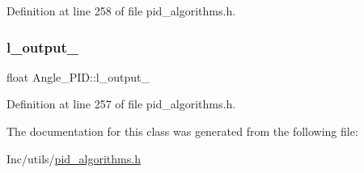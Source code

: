 Definition at line 258 of file pid\+\_\+algorithms.\+h.

\mbox{\label{class_angle___p_i_d_a16d9de5cbedec4c1597b6c6c31901060}} 
\subsubsection{\texorpdfstring{l\_output\_}{l\_output\_}}
{\footnotesize\ttfamily float Angle\+\_\+\+P\+I\+D\+::l\+\_\+output\+\_\+\hspace{0.3cm}{\ttfamily [private]}}



Definition at line 257 of file pid\+\_\+algorithms.\+h.



The documentation for this class was generated from the following file\+:\begin{DoxyCompactItemize}
\item 
Inc/utils/\mbox{\hyperlink{pid__algorithms_8h}{pid\+\_\+algorithms.\+h}}\end{DoxyCompactItemize}
